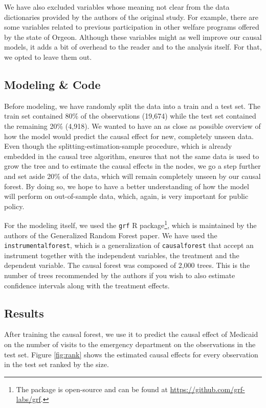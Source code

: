 We have also excluded variables whose meaning not clear from the data dictionaries provided by the authors of the original study. For example, there are some variables related to previous participation in other welfare programs offered by the state of Orgeon. Although these variables might as well improve our causal models, it adds a bit of overhead to the reader and to the analysis itself. For that, we opted to leave them out.

\subsection{Modeling \& Code}

Before modeling, we have randomly split the data into a train and a test set. The train set contained 80\% of the observations (19,674) while the test set contained the remaining 20\% (4,918). We wanted to have an as close as possible overview of how the model would predict the causal effect for new, completely unseen data. Even though the splitting-estimation-sample procedure, which is already embedded in the causal tree algorithm, ensures that not the same data is used to grow the tree and to estimate the causal effects in the nodes, we go a step further and set aside 20\% of the data, which will remain completely unseen by our causal forest. By doing so, we hope to have a better understanding of how the model will perform on out-of-sample data, which, again, is very important for public policy.

For the modeling itself, we used the \texttt{grf} R package\footnote{The package is open-source and can be found at \url{https://github.com/grf-labs/grf}.}, which is maintained by the authors of the Generalized Random Forest paper. We have used the \texttt{instrumental\textunderscore forest}, which is a generalization of \texttt{causal\textunderscore forest} that accept an instrument together with the independent variables, the treatment and the dependent variable. The causal forest was composed of 2,000 trees. This is the number of trees recommended by the authors if you wish to also estimate confidence intervals along with the treatment effects.

\subsection{Results}

After training the causal forest, we use it to predict the causal effect of Medicaid on the number of visits to the emergency department on the observations in the test set. Figure \ref{fig:rank} shows the estimated causal effects for every observation in the test set ranked by the size.

